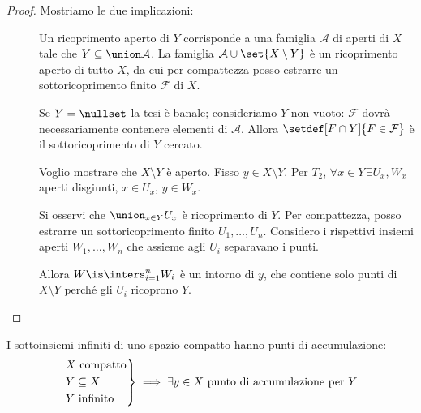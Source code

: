 \begin{proof}
Mostriamo le due implicazioni:
\begin{description}
	\item[\proofleftarrow]
		Un ricoprimento aperto di $Y$ corrisponde a una famiglia  $\mathcal A$ di aperti di $X$ tale che $Y\subseteq \union\mathcal A$.
  La famiglia $\mathcal A \cup \set{X\setminus Y}$ è un ricoprimento aperto di tutto $X$,
		da cui per compattezza posso estrarre un sottoricoprimento finito $\mathcal F$ di $X$.
  
  Se $Y=\nullset$ la tesi è banale; consideriamo $Y$ non vuoto:
  $\mathcal F$ dovrà necessariamente contenere elementi di $\mathcal A$.
  Allora $\setdef[F\cap Y]{F\in\mathcal F}$ è il sottoricoprimento di $Y$ cercato.\footnotemark
 \item[\proofrightarrow]
		Voglio mostrare che $X\setminus Y$ è aperto.
		Fisso $y\in X\setminus Y$.
  Per $T_2$, $\forall x\in Y\, \exists U_x, W_x$ aperti disgiunti, $x\in U_x$, $y\in W_x$.
		
		Si osservi che $\union_{x\in Y}U_x$ è ricoprimento di $Y$. Per compattezza, posso estrarre un sottoricoprimento finito $U_1,\dots, U_n$.
		Considero i rispettivi insiemi aperti $W_1,\dots, W_n$ che assieme agli $U_i$ separavano i punti.
  
		Allora $W\is \inters_{i=1}^nW_i$ è un intorno di $y$,
  che contiene solo punti di $X\setminus Y$ perché gli $U_i$ ricoprono $Y$.
  \qedhere
	\end{description}
\end{proof}


\begin{lemma}
 I sottoinsiemi infiniti di uno spazio compatto hanno punti di accumulazione:
 \[\begin{rcases}
  \text{$X$ compatto} \\
  Y\subseteq X \\
  \text{$Y$ infinito}
 \end{rcases}\implies
 \exists y\in X\text{ punto di accumulazione per }Y\]
\end{lemma}

